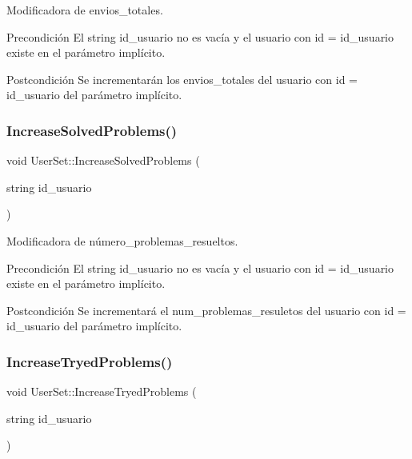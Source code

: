 Modificadora de envios\+\_\+totales. 

\begin{DoxyPrecond}{Precondición}
El string id\+\_\+usuario no es vacía y el usuario con id = id\+\_\+usuario existe en el parámetro implícito. 
\end{DoxyPrecond}
\begin{DoxyPostcond}{Postcondición}
Se incrementarán los envios\+\_\+totales del usuario con id = id\+\_\+usuario del parámetro implícito. 
\end{DoxyPostcond}
\mbox{\label{class_user_set_a7462310142b0f573b51708d9eb7ead56}} 
\subsubsection{\texorpdfstring{Increase\+Solved\+Problems()}{IncreaseSolvedProblems()}}
{\footnotesize\ttfamily void User\+Set\+::\+Increase\+Solved\+Problems (\begin{DoxyParamCaption}\item[{string}]{id\+\_\+usuario }\end{DoxyParamCaption})}



Modificadora de número\+\_\+problemas\+\_\+resueltos. 

\begin{DoxyPrecond}{Precondición}
El string id\+\_\+usuario no es vacía y el usuario con id = id\+\_\+usuario existe en el parámetro implícito. 
\end{DoxyPrecond}
\begin{DoxyPostcond}{Postcondición}
Se incrementará el num\+\_\+problemas\+\_\+resuletos del usuario con id = id\+\_\+usuario del parámetro implícito. 
\end{DoxyPostcond}
\mbox{\label{class_user_set_aaba14c5d99e15bc568bf6985e77c85af}} 
\subsubsection{\texorpdfstring{Increase\+Tryed\+Problems()}{IncreaseTryedProblems()}}
{\footnotesize\ttfamily void User\+Set\+::\+Increase\+Tryed\+Problems (\begin{DoxyParamCaption}\item[{string}]{id\+\_\+usuario }\end{DoxyParamCaption})}



